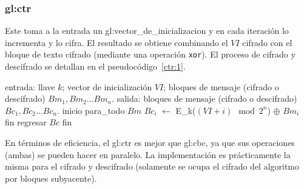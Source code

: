 %
%

\subsubsection{\texorpdfstring{\acrfull{gl:ctr}}{Counter Mode (CTR)}}
\label{sec:ctr}

Este toma a la entrada un \gls{gl:vector_de_inicializacion} y en cada iteración
lo incrementa y lo cifra. El resultado se obtiene combinando el $ VI $ cifrado
con el bloque de texto cifrado (mediante una operación \verb|xor|). El proceso
de cifrado y descifrado se detallan en el pseudocódigo~\ref{ctr:1}.

\begin{pseudocodigo}[%
    caption={\Gls{gl:modo_de_operacion} \acrshort{gl:ctr}%
      (cifrado y descifrado).},
    label={ctr:1}%
  ]
    entrada: llave $ k $; vector de inicialización $ VI $;
             bloques de mensaje (cifrado o descifrado) $ Bm_1, Bm_2 \dots Bm_n $.
    salida:  bloques de mensaje (cifrado o descifrado) $ Bc_1, Bc_2 \dots Bc_n $.
    inicio
      para_todo $Bm$
        $Bc_i$ $\gets$ E_k($ (VI + i) \mod 2^n $) $\oplus$ $Bm_i$
      fin
      regresar $Bc$
    fin
\end{pseudocodigo}

En términos de eficiencia, el \gls{gl:ctr} es mejor que \gls{gl:cbc}, ya que
sus operaciones (ambas) se pueden hacer en paralelo. La implementación es
prácticamente la misma para el cifrado y descifrado (solamente se ocupa el
cifrado del algoritmo por bloques subyacente).
